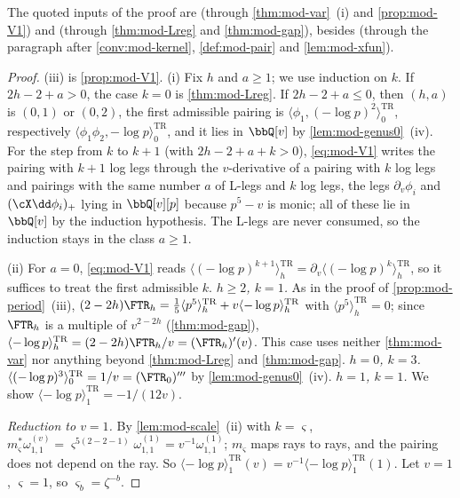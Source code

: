 The quoted inputs of the proof are \cite[Thm.~5.1, (5-14)]{Eynard:2007kz} (through \cref{thm:mod-var}~(i) and \cref{prop:mod-V1}) and \cite[Thm.~7.1]{ABDKS25} (through \cref{thm:mod-Lreg} and \cref{thm:mod-gap}), besides \cite[Thm.~4.2, Thm.~4.6]{Eynard:2007kz} (through the paragraph after \cref{conv:mod-kernel}, \cref{def:mod-pair} and \cref{lem:mod-xfun}).

\begin{proof}
(iii) is \cref{prop:mod-V1}. (i) Fix $h$ and $a\geq 1$; we use induction on $k$. If $2h-2+a>0$, the case $k=0$ is \cref{thm:mod-Lreg}. If $2h-2+a\leq 0$, then $(h,a)$ is $(0,1)$ or $(0,2)$, the first admissible pairing is $\langle\phi_1,(-\log p)^2\rangle^{\mathrm{TR}}_0$, respectively $\langle\phi_1\phi_2,-\log p\rangle^{\mathrm{TR}}_0$, and it lies in $\bbQ[v]$ by \cref{lem:mod-genus0}~(iv). For the step from $k$ to $k+1$ (with $2h-2+a+k>0$), \eqref{eq:mod-V1} writes the pairing with $k+1$ log legs through the $v$-derivative of a pairing with $k$ log legs and pairings with the same number $a$ of L-legs and $k$ log legs, the legs $\partial_v\phi_i$ and $(\cX\dd\phi_i)_+$ lying in $\bbQ[v][p]$ because $p^5-v$ is monic; all of these lie in $\bbQ[v]$ by the induction hypothesis. The L-legs are never consumed, so the induction stays in the class $a\geq 1$.

(ii) For $a=0$, \eqref{eq:mod-V1} reads $\langle(-\log p)^{k+1}\rangle^{\mathrm{TR}}_h=\partial_v\langle(-\log p)^k\rangle^{\mathrm{TR}}_h$, so it suffices to treat the first admissible $k$. \emph{$h\geq 2$, $k=1$.} As in the proof of \cref{prop:mod-period}~(iii), $(2-2h)\FTR_h=\frac15\langle p^5\rangle^{\mathrm{TR}}_h+v\langle-\log p\rangle^{\mathrm{TR}}_h$ with $\langle p^5\rangle^{\mathrm{TR}}_h=0$; since $\FTR_h$ is a multiple of $v^{2-2h}$ (\cref{thm:mod-gap}), $\langle-\log p\rangle^{\mathrm{TR}}_h=(2-2h)\FTR_h/v=(\FTR_h)'(v)$. This case uses neither \cref{thm:mod-var} nor anything beyond \cref{thm:mod-Lreg} and \cref{thm:mod-gap}. \emph{$h=0$, $k=3$.} $\langle(-\log p)^3\rangle^{\mathrm{TR}}_0=1/v=(\FTR_0)'''$ by \cref{lem:mod-genus0}~(iv). \emph{$h=1$, $k=1$.} We show $\langle-\log p\rangle^{\mathrm{TR}}_1=-1/(12v)$.

\emph{Reduction to $v=1$.} By \cref{lem:mod-scale}~(ii) with $k=\varsigma$, $m_\varsigma^*\omega^{(v)}_{1,1}=\varsigma^{5(2-2-1)}\omega^{(1)}_{1,1}=v^{-1}\omega^{(1)}_{1,1}$; $m_\varsigma$ maps rays to rays, and the pairing does not depend on the ray. So $\langle-\log p\rangle^{\mathrm{TR}}_1(v)=v^{-1}\langle-\log p\rangle^{\mathrm{TR}}_1(1)$. Let $v=1$, $\varsigma=1$, so $\varsigma_b=\zeta^{-b}$.


\end{proof}
